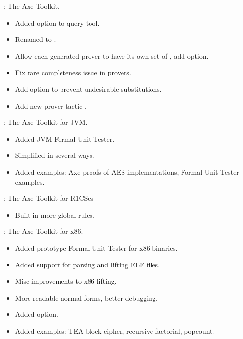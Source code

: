 \begin{frame}

\implibtitle

:
The Axe Toolkit.
\begin{itemize}
\item Added  option to query tool.
\item Renamed  to .
\item Allow each generated prover to have its own set of , add  option.
\item Fix rare completeness issue in provers.
\item Add  option to prevent undesirable substitutions.
\item Add new prover tactic .
\end{itemize}

\end{frame}


\begin{frame}

\implibtitle

:
The Axe Toolkit for JVM.
\begin{itemize}
\item Added JVM Formal Unit Tester.
\item Simplified  in several ways.
\item Added examples: Axe proofs of AES implementations, Formal Unit Tester examples.
\end{itemize}

:
The Axe Toolkit for R1CSes
\begin{itemize}
\item Built in more global rules.
\end{itemize}

\end{frame}


\begin{frame}

\implibtitle

:
The Axe Toolkit for x86.
\begin{itemize}
\item Added prototype Formal Unit Tester for x86 binaries.
\item Added support for parsing and lifting ELF files.
\item Misc improvements to x86 lifting.
\item More readable normal forms, better debugging.
\item Added  option.
\item Added examples: TEA block cipher, recursive factorial, popcount.
\end{itemize}

\end{frame}


